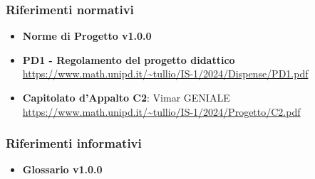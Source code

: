 \subsubsection{Riferimenti normativi}
\begin{itemize}
    \item \textbf{Norme di Progetto v1.0.0}
    \item \textbf{PD1 - Regolamento del progetto didattico} \\
    \url{https://www.math.unipd.it/~tullio/IS-1/2024/Dispense/PD1.pdf} 
    \item \textbf{Capitolato d'Appalto C2}: Vimar GENIALE \\
    \url{https://www.math.unipd.it/~tullio/IS-1/2024/Progetto/C2.pdf}
    \end{itemize}
\subsubsection{Riferimenti informativi}
\begin{itemize}
    \item \textbf{Glossario v1.0.0} \\
\end{itemize}